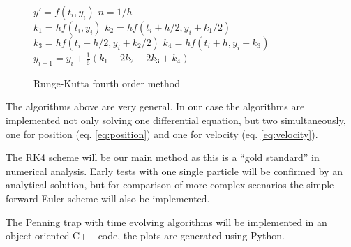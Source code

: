 \documentclass[english,notitlepage,reprint,nofootinbib]{revtex4-1}  %
\begin{document}
\begin{figure}[H]
    \begin{algorithm}[H]
        \caption{Runge-Kutta fourth order method}
        \label{algo:RK4}
        \begin{algorithmic}
            \State $y' = f(t_i,y_i)$        
            \State $n = 1 / h$ 
            \\
            \State $k_1 = hf(t_i,y_i)$  
            \State $k_2 = hf(t_i + h/2, y_i +k_1/2)$  
            \State $k_3 = hf(t_i + h/2, y_i + k_2/2)$ 
            \State $k_4 = hf(t_i + h, y_i + k_3)$ 
            \State $y_{i+1} = y_i + \frac{1}{6}(k_1 + 2k_2 + 2k_3 + k_4)$ 
            \EndFor
            \EndProcedure
        \end{algorithmic}
    \end{algorithm}
\end{figure}
The algorithms above are very general. In our case the algorithms are implemented not only solving one differential equation, but two simultaneously, one for position (eq. \ref{eq:position}) and one for velocity (eq. \ref{eq:velocity}).

The RK4 scheme will be our main method as this is a ``gold standard'' in numerical analysis.
Early tests with one single particle will be confirmed by an analytical solution, but for comparison of more complex
scenarios the simple forward Euler scheme will also be implemented.

The Penning trap with time evolving algorithms will be implemented in an object-oriented C++ code, the plots are generated using Python.
\end{document}

